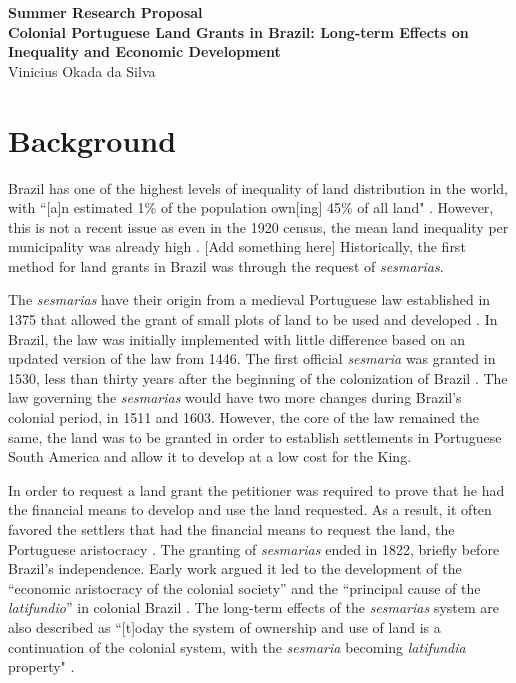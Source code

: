 \documentclass{article}
\begin{document}
\begin{center}
\large \textbf{Summer Research Proposal}
\\
\normalsize \textbf{Colonial Portuguese Land Grants in Brazil: Long-term Effects on Inequality and Economic Development}
\\
\smallskip
\small Vinicius Okada da Silva
\end{center}

\vspace{-10mm}

\section{Background}

Brazil has one of the highest levels of inequality of land distribution in the world, with ``[a]n estimated 1\% of the population own[ing] 45\% of all land" \parencite{Usaid2016-xs}. However, this is not a recent issue as even in the 1920 census, the mean land inequality per municipality was already high \parencite{Wigton-Jones2020-ex}. 
[Add something here]
Historically, the first method for land grants in Brazil was through the request of \textit{sesmarias}.

The \textit{sesmarias} have their origin from a medieval Portuguese law established in 1375 that allowed the grant of small plots of land to be used and developed \parencite[p.~16]{Diegues_Junior1959-ba}. 
In Brazil, the law was initially implemented with little difference based on an updated version of the law from 1446.
The first official \textit{sesmaria} was granted in 1530, less than thirty years after the beginning of the colonization of Brazil \parencite[p.~16]{Diegues_Junior1959-ba}. 
The law governing the \textit{sesmarias} would have two more changes during Brazil's colonial period, in 1511 and 1603. 
However, the core of the law remained the same, the land was to be granted in order to establish settlements in Portuguese South America and allow it to develop at a low cost for the King. 

In order to request a land grant the petitioner was required to prove that he had the financial means to develop and use the land requested.
As a result, it often favored the settlers that had the financial means to request the land, the Portuguese aristocracy \parencite{Lobb1976-mc}. 
The granting of \textit{sesmarias} ended in 1822, briefly before Brazil's independence.
Early work argued it led to the development of the ``economic aristocracy of the colonial society'' and the ``principal cause of the \textit{latifundio}'' in colonial Brazil \parencites[p.~36]{Lima2002-kd}[p.~48]{Da_Costa_Porto1979-dz}. 
The long-term effects of the \textit{sesmarias} system are also described as ``[t]oday the system of ownership and use of land is a continuation of the colonial system, with the \textit{sesmaria} becoming \textit{latifundia} property" \parencite[p.~18]{Andrade1980-md}.
\end{document}
